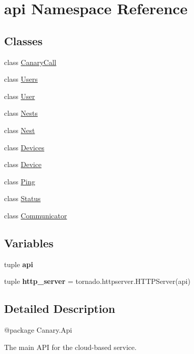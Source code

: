 \hypertarget{namespaceapi}{\section{api Namespace Reference}
\label{namespaceapi}
}
\subsection*{Classes}
\begin{DoxyCompactItemize}
\item 
class \hyperlink{classapi_1_1_canary_call}{Canary\-Call}
\item 
class \hyperlink{classapi_1_1_users}{Users}
\item 
class \hyperlink{classapi_1_1_user}{User}
\item 
class \hyperlink{classapi_1_1_nests}{Nests}
\item 
class \hyperlink{classapi_1_1_nest}{Nest}
\item 
class \hyperlink{classapi_1_1_devices}{Devices}
\item 
class \hyperlink{classapi_1_1_device}{Device}
\item 
class \hyperlink{classapi_1_1_ping}{Ping}
\item 
class \hyperlink{classapi_1_1_status}{Status}
\item 
class \hyperlink{classapi_1_1_communicator}{Communicator}
\end{DoxyCompactItemize}
\subsection*{Variables}
\begin{DoxyCompactItemize}
\item 
tuple {\bfseries api}
\item 
\hypertarget{namespaceapi_a1125afafaabf4d39e0f633946f62eecd}{tuple {\bfseries http\-\_\-server} = tornado.\-httpserver.\-H\-T\-T\-P\-Server(api)}\label{namespaceapi_a1125afafaabf4d39e0f633946f62eecd}

\end{DoxyCompactItemize}


\subsection{Detailed Description}
\begin{DoxyVerb}@package Canary.Api

The main API for the cloud-based service.
\end{DoxyVerb}
 

